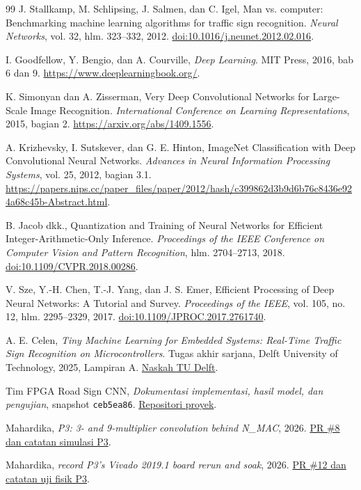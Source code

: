 \documentclass[11pt,a4paper]{article}
\begin{document}
\begin{thebibliography}{99}
J. Stallkamp, M. Schlipsing, J. Salmen, dan C. Igel,
Man vs. computer: Benchmarking machine learning algorithms for traffic sign recognition.
\textit{Neural Networks}, vol. 32, hlm. 323--332, 2012.
\href{https://doi.org/10.1016/j.neunet.2012.02.016}{doi:10.1016/j.neunet.2012.02.016}.

I. Goodfellow, Y. Bengio, dan A. Courville, \textit{Deep Learning}.
MIT Press, 2016, bab 6 dan 9.
\url{https://www.deeplearningbook.org/}.


K. Simonyan dan A. Zisserman,
Very Deep Convolutional Networks for Large-Scale Image Recognition.
\textit{International Conference on Learning Representations}, 2015, bagian 2.
\url{https://arxiv.org/abs/1409.1556}.

A. Krizhevsky, I. Sutskever, dan G. E. Hinton,
ImageNet Classification with Deep Convolutional Neural Networks.
\textit{Advances in Neural Information Processing Systems}, vol. 25, 2012,
bagian 3.1.
\url{https://papers.nips.cc/paper_files/paper/2012/hash/c399862d3b9d6b76c8436e924a68c45b-Abstract.html}.

B. Jacob dkk., Quantization and Training of Neural Networks for Efficient Integer-Arithmetic-Only Inference.
\textit{Proceedings of the IEEE Conference on Computer Vision and Pattern Recognition}, hlm. 2704--2713, 2018.
\href{https://doi.org/10.1109/CVPR.2018.00286}{doi:10.1109/CVPR.2018.00286}.

V. Sze, Y.-H. Chen, T.-J. Yang, dan J. S. Emer,
Efficient Processing of Deep Neural Networks: A Tutorial and Survey.
\textit{Proceedings of the IEEE}, vol. 105, no. 12, hlm. 2295--2329, 2017.
\href{https://doi.org/10.1109/JPROC.2017.2761740}{doi:10.1109/JPROC.2017.2761740}.

A. E. Celen, \textit{Tiny Machine Learning for Embedded Systems: Real-Time Traffic Sign Recognition on Microcontrollers}.
Tugas akhir sarjana, Delft University of Technology, 2025, Lampiran A.
\href{https://repository.tudelft.nl/file/File_c9c48f2c-fd1d-4989-a3b2-2f12265c3bee}{Naskah TU Delft}.

Tim FPGA Road Sign CNN, \textit{Dokumentasi implementasi, hasil model, dan pengujian}, snapshot \texttt{ceb5ea86}.
\href{https://github.com/saufik-ramadhan/fpga_road_sign_cnn/tree/ceb5ea86}{Repositori proyek}.

Mahardika, \textit{P3: 3- and 9-multiplier convolution behind N\_MAC}, 2026.
\href{https://github.com/saufik-ramadhan/fpga_road_sign_cnn/pull/8}{PR \#8 dan catatan simulasi P3}.

Mahardika, \textit{record P3's Vivado 2019.1 board rerun and soak}, 2026.
\href{https://github.com/saufik-ramadhan/fpga_road_sign_cnn/pull/12}{PR \#12 dan catatan uji fisik P3}.
\end{thebibliography}
\end{document}
